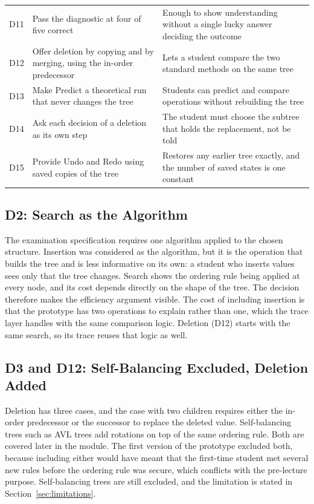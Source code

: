 \begin{table}[H]
\begin{tabularx}{\textwidth}{p{1.2cm} p{4.2cm} X}
D11 & Pass the diagnostic at four of five correct & Enough to show understanding without a single lucky answer deciding the outcome \\
D12 & Offer deletion by copying and by merging, using the in-order predecessor & Lets a student compare the two standard methods on the same tree \\
D13 & Make Predict a theoretical run that never changes the tree & Students can predict and compare operations without rebuilding the tree \\
D14 & Ask each decision of a deletion as its own step & The student must choose the subtree that holds the replacement, not be told \\
D15 & Provide Undo and Redo using saved copies of the tree & Restores any earlier tree exactly, and the number of saved states is one constant \\
\bottomrule
\end{tabularx}
\end{table}

\subsection{D2: Search as the Algorithm}
The examination specification requires one algorithm applied to the chosen structure. Insertion was considered as the algorithm, but it is the operation that builds the tree and is less informative on its own: a student who inserts values sees only that the tree changes. Search shows the ordering rule being applied at every node, and its cost depends directly on the shape of the tree. The decision therefore makes the efficiency argument visible. The cost of including insertion is that the prototype has two operations to explain rather than one, which the trace layer handles with the same comparison logic. Deletion (D12) starts with the same search, so its trace reuses that logic as well.

\subsection{D3 and D12: Self-Balancing Excluded, Deletion Added}
Deletion has three cases, and the case with two children requires either the in-order predecessor or the successor to replace the deleted value. Self-balancing trees such as AVL trees add rotations on top of the same ordering rule. Both are covered later in the module. The first version of the prototype excluded both, because including either would have meant that the first-time student met several new rules before the ordering rule was secure, which conflicts with the pre-lecture purpose. Self-balancing trees are still excluded, and the limitation is stated in Section~\ref{sec:limitations}.

